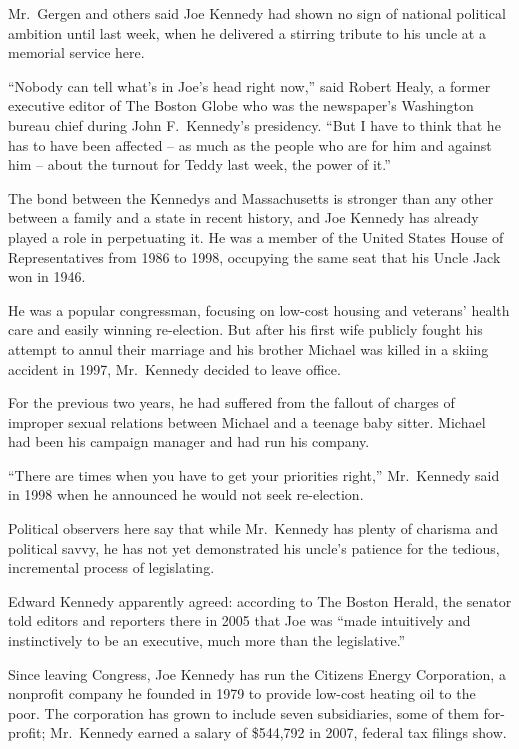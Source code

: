 ﻿\documentclass[12pt]{article}
\begin{document}
Mr.~Gergen and others said Joe Kennedy had shown no sign of national political ambition until last
week, when he delivered a stirring tribute to his uncle at a memorial service here.

``Nobody can tell what's in Joe's head right now,'' said Robert Healy, a former executive editor of
The Boston Globe who was the newspaper's Washington bureau chief during John F.~Kennedy's
presidency. ``But I have to think that he has to have been affected -- as much as the people who are
for him and against him -- about the turnout for Teddy last week, the power of it.''

The bond between the Kennedys and Massachusetts is stronger than any other between a family and a
state in recent history, and Joe Kennedy has already played a role in perpetuating\cite{perpetuate}
it. He was a member of the United States House of Representatives from 1986 to 1998, occupying the
same seat that his Uncle Jack won in 1946.

He was a popular congressman, focusing on low-cost housing and veterans' health care and easily
winning re-election. But after his first wife publicly fought his attempt to annul their marriage
and his brother Michael was killed in a skiing accident in 1997, Mr.~Kennedy decided to leave
office.

For the previous two years, he had suffered from the fallout of charges of improper sexual relations
between Michael and a teenage baby sitter. Michael had been his campaign manager and had run his
company.

``There are times when you have to get your priorities right,'' Mr.~Kennedy said in 1998 when he
announced he would not seek re-election.

Political observers here say that while Mr.~Kennedy has plenty of charisma and political
savvy\cite{savvy}, he has not yet demonstrated his uncle's patience for the tedious, incremental
process of legislating.

Edward Kennedy apparently agreed: according to The Boston Herald, the senator told editors and
reporters there in 2005 that Joe was ``made intuitively and instinctively to be an executive, much
more than the legislative.''

Since leaving Congress, Joe Kennedy has run the Citizens Energy Corporation, a nonprofit company he
founded in 1979 to provide low-cost heating oil to the poor. The corporation has grown to include
seven subsidiaries\cite{subsidiary}, some of them for-profit; Mr.~Kennedy earned a salary of
\$544,792 in 2007, federal tax filings show.
\end{document}
